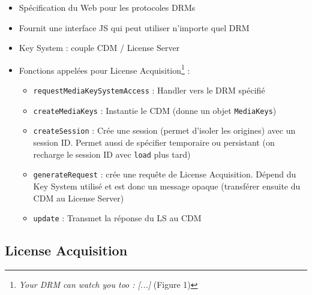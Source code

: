 \documentclass[french]{article}
\begin{document}
\begin{itemize}
	\item Spécification du Web pour les protocoles DRMs
	\item Fournit une interface JS qui peut utiliser n'importe quel DRM
	\item Key System : couple CDM / License Server
	\item Fonctions appelées pour License Acquisition\footnote{\emph{Your DRM can watch you too : [...]} (Figure 1)} :
	\begin{itemize}
		\item \texttt{requestMediaKeySystemAccess} : Handler vers le DRM spécifié
		\item \texttt{createMediaKeys} : Instantie le CDM (donne un objet \texttt{MediaKeys})
		\item \texttt{createSession} : Crée une session (permet d'isoler les origines) avec un session ID. Permet aussi de spécifier temporaire ou persistant (on recharge le session ID avec \texttt{load} plus tard)
		
		\item \texttt{generateRequest} : crée une requête de License Acquisition. Dépend du Key System utilisé et est donc un message opaque (transférer ensuite du CDM au License Server)
		
		\item \texttt{update} : Transmet la réponse du LS au CDM
	\end{itemize}
\end{itemize}


\subsection{License Acquisition}
\end{document}
